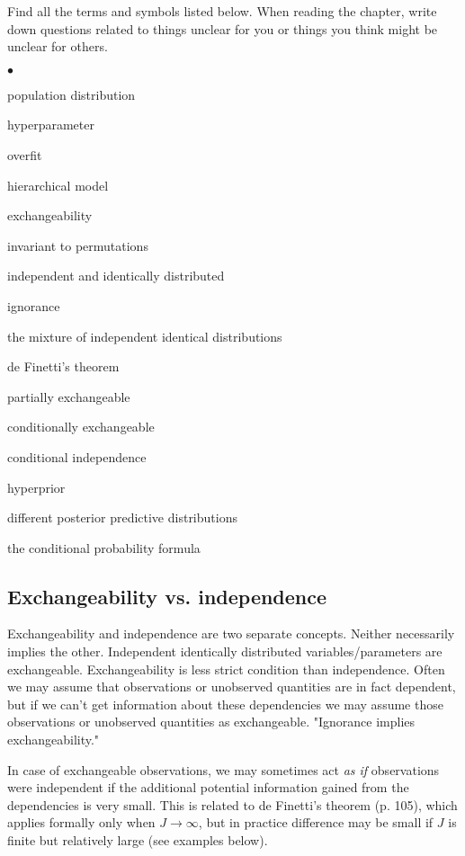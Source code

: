 \documentclass[a4paper,11pt,english]{article}
\begin{document}
Find all the terms and symbols listed below. When reading the chapter,
write down questions related to things unclear for you or things you
think might be unclear for others. 
\begin{list}{$\bullet$}{\parsep=0pt\itemsep=2pt}
\item population distribution
\item hyperparameter
\item overfit
\item hierarchical model
\item exchangeability
\item invariant to permutations
\item independent and identically distributed
\item ignorance
\item the mixture of independent identical distributions
\item de Finetti's theorem
\item partially exchangeable
\item conditionally exchangeable
\item conditional independence
\item hyperprior
\item different posterior predictive distributions
\item the conditional probability formula
\end{list}

\subsection*{Exchangeability vs. independence}

Exchangeability and independence are two separate concepts.
Neither necessarily implies the other. Independent identically
distributed variables/parameters are exchangeable. Exchangeability
is less strict condition than independence. Often we may assume
that observations or unobserved quantities are in fact dependent,
but if we can't get information about these dependencies we may
assume those observations or unobserved quantities as
exchangeable. "Ignorance implies exchangeability."

In case of exchangeable observations, we may sometimes act \emph{as
  if} observations were independent if the additional potential
information gained from the dependencies is very small. This is
related to de Finetti's theorem (p. 105), which applies formally
only when $J\rightarrow\infty$, but in practice difference may be
small if $J$ is finite but relatively large (see examples below).
\end{document}
